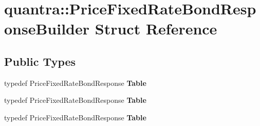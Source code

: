 \hypertarget{structquantra_1_1PriceFixedRateBondResponseBuilder}{}\section{quantra\+:\+:Price\+Fixed\+Rate\+Bond\+Response\+Builder Struct Reference}
\label{structquantra_1_1PriceFixedRateBondResponseBuilder}
\subsection*{Public Types}
\begin{DoxyCompactItemize}
\item 
\mbox{\label{structquantra_1_1PriceFixedRateBondResponseBuilder_af4f1e6db3bbe97c20919ec6e68a3bbfb}} 
typedef Price\+Fixed\+Rate\+Bond\+Response {\bfseries Table}
\item 
\mbox{\label{structquantra_1_1PriceFixedRateBondResponseBuilder_af4f1e6db3bbe97c20919ec6e68a3bbfb}} 
typedef Price\+Fixed\+Rate\+Bond\+Response {\bfseries Table}
\item 
\mbox{\label{structquantra_1_1PriceFixedRateBondResponseBuilder_af4f1e6db3bbe97c20919ec6e68a3bbfb}} 
typedef Price\+Fixed\+Rate\+Bond\+Response {\bfseries Table}
\end{DoxyCompactItemize}
